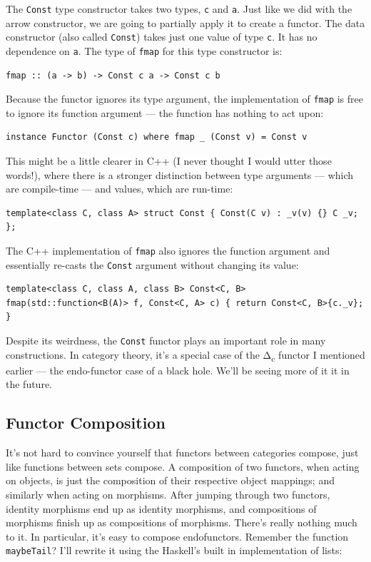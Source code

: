 The \texttt{Const} type constructor takes two types, \texttt{c} and
\texttt{a}. Just like we did with the arrow constructor, we are going to
partially apply it to create a functor. The data constructor (also
called \texttt{Const}) takes just one value of type \texttt{c}. It has
no dependence on \texttt{a}. The type of \texttt{fmap} for this type
constructor is:

\begin{verbatim}
fmap :: (a -> b) -> Const c a -> Const c b
\end{verbatim}

Because the functor ignores its type argument, the implementation of
\texttt{fmap} is free to ignore its function argument --- the function
has nothing to act upon:

\begin{verbatim}
instance Functor (Const c) where fmap _ (Const v) = Const v
\end{verbatim}

This might be a little clearer in C++ (I never thought I would utter
those words!), where there is a stronger distinction between type
arguments --- which are compile-time --- and values, which are run-time:

\begin{verbatim}
template<class C, class A> struct Const { Const(C v) : _v(v) {} C _v; };
\end{verbatim}

The C++ implementation of \texttt{fmap} also ignores the function
argument and essentially re-casts the \texttt{Const} argument without
changing its value:

\begin{verbatim}
template<class C, class A, class B> Const<C, B> fmap(std::function<B(A)> f, Const<C, A> c) { return Const<C, B>{c._v}; }
\end{verbatim}

Despite its weirdness, the \texttt{Const} functor plays an important
role in many constructions. In category theory, it's a special case of
the Δ\textsubscript{c} functor I mentioned earlier --- the endo-functor
case of a black hole. We'll be seeing more of it it in the future.

\subsection{Functor Composition}\label{functor-composition}

It's not hard to convince yourself that functors between categories
compose, just like functions between sets compose. A composition of two
functors, when acting on objects, is just the composition of their
respective object mappings; and similarly when acting on morphisms.
After jumping through two functors, identity morphisms end up as
identity morphisms, and compositions of morphisms finish up as
compositions of morphisms. There's really nothing much to it. In
particular, it's easy to compose endofunctors. Remember the function
\texttt{maybeTail}? I'll rewrite it using the Haskell's built in
implementation of lists:

